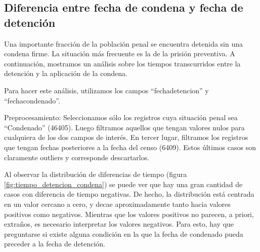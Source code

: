 \documentclass[10pt]{article}
\begin{document}
\subsection{Diferencia entre fecha de condena y fecha de detenci\'on}

Una importante fracci\'on de la poblaci\'on penal se encuentra detenida sin una condena firme. La situaci\'on m\'as frecuente es la de la prisi\'on preventiva. A continuaci\'on, mostramos un an\'alisis sobre los tiempos transcurridos entre la detenci\'on y la aplicaci\'on de la condena. 

Para hacer este an\'alisis, utilizamos los campos ``fecha\textunderscore detencion'' y ``fecha\textunderscore condenado''.

Preprocesamiento: Seleccionamos s\'olo los registros cuya situaci\'on penal sea ``Condenado'' (46405). Luego filtramos aquellos que tengan valores nulos para cualquiera de los dos campos de inter\'es. En tercer lugar, filtramos los registros que tengan fechas posteriores a la fecha del censo (6409). Estos \'ultimos casos son claramente outliers y corresponde descartarlos.

Al observar la distribuci\'on de diferencias de tiempo (figura \ref{fig:tiempo_detencion_condena}) se puede ver que hay una gran cantidad de casos con diferencia de tiempo negativas. De hecho, la distribuci\'on est\'a centrada en un valor cercano a cero, y decae aproximadamente tanto hacia valores positivos como negativos. Mientras que los valores positivos no parecen, a priori, extraños, es necesario interpretar los valores negativos. Para esto, hay que preguntarse si existe alguna condición en la que la fecha de condenado pueda preceder a la fecha de detención. 
\end{document}
